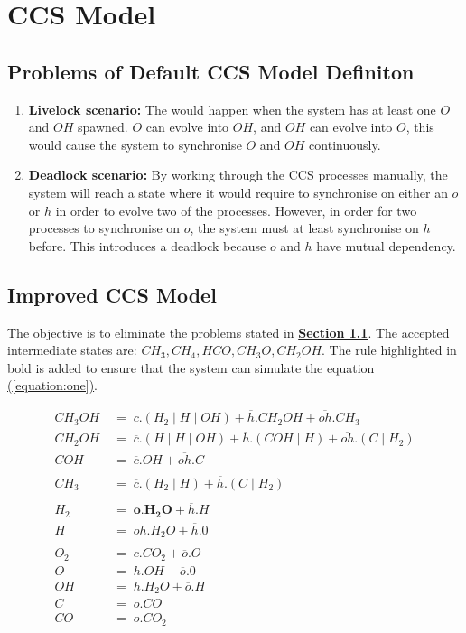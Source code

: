 \documentclass[12pt, a4paper]{article}
\begin{document}
\section{CCS Model}
\subsection{Problems of Default CCS Model Definiton} \label{subsec:default_problems}
\begin{enumerate}
  \item \textbf{Livelock scenario:} The would happen when the system has at least one $O$
  and $OH$ spawned. $O$ can evolve into $OH$, and $OH$ can evolve into $O$, this would cause the
  system to synchronise $O$ and $OH$ continuously.
  \item \textbf{Deadlock scenario:} By working through the CCS processes manually, the system will
  reach a state where it would require to synchronise on either an $o$ or $h$ in order to evolve two
  of the processes. However, in order for two processes to synchronise on $o$, the system must at
  least synchronise on $h$ before. This introduces a deadlock because $o$ and $h$ have mutual
  dependency.
\end{enumerate}

\subsection{Improved CCS Model}
The objective is to eliminate the problems stated in
\hyperref[subsec:default_problems]{\textbf{Section \ref*{subsec:default_problems}}}. The accepted
intermediate states are: $CH_3, CH_4, HCO, CH_3O, CH_2OH$. The rule highlighted in bold is added to
ensure that the system can simulate the equation \hyperref[equation:one]{(\ref*{equation:one})}.

\begin{align*}
  CH_3OH \; &= \; \overline{c}.(H_2 \mid H \mid OH) + \overline{h}.CH_2OH + \overline{oh}.CH_3 \\
  CH_2OH \; &= \; \overline{c}.(H \mid H \mid OH) + \overline{h}.(COH \mid H) + \overline{oh}.(C \mid H_2) \\
  COH \; &= \; \overline{c}.OH + \overline{oh}.C \\
  \\
  CH_3 \; &= \; \overline{c}.(H_2 \mid H) + \overline{h}.(C \mid H_2) \\
  \\
  H_2 \; &= \; \boldsymbol{o.H_2O} + \overline{h}.H \\
  H \; &= \; oh.H_2O + \overline{h}.0 \\
  \\
  O_2 \medspace \; &= \; c.CO_2 + \overline{o}.O \\
  O \; &= \; h.OH + \overline{o}.0 \\
  OH \; &= \; h.H_2O + \overline{o}.H \\
  C \; &= \; o.CO \\
  CO \; &= \; o.CO_2
\end{align*}
\end{document}
